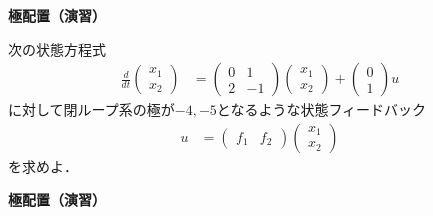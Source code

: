 



\exheader

\noindent
{\bf 極配置（演習）}

次の状態方程式
\begin{align*}
	\frac{d}{dt}
	\left (
	\begin{array}{c}
	 x_1 \\ x_2 
	\end{array}
	\right )
	& = 
	\left (
	\begin{array}{cc}
	 0 & 1 \\
	 2 & -1
	\end{array}
	\right )
	\left (
	\begin{array}{c}
	 x_1 \\ x_2 
	\end{array}
	\right )
	+
	\left (
	\begin{array}{c}
	 0 \\ 1 
	\end{array}
	\right )
	u
\end{align*}
に対して閉ループ系の極が$-4,-5$となるような状態フィードバック
\begin{align*}
	u 
	&=
	\left (
	\begin{array}{cc}
	 f_1 & f_2
	\end{array}
	\right )
	\left (
	\begin{array}{c}
	 x_1 \\ x_2 
	\end{array}
	\right )
\end{align*}
を求めよ．

\newpage

\noindent
{\bf 極配置（演習）}

